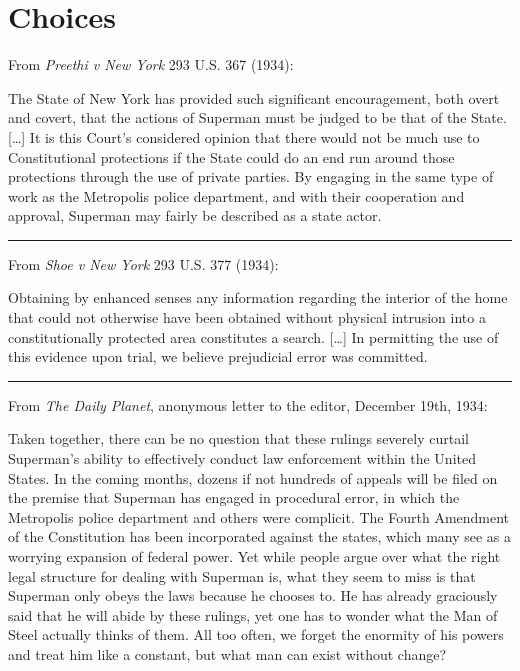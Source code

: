 \chapter{Choices}\label{choices}

From \emph{Preethi v New York} 293 U.S. 367 (1934):

The State of New York has provided such significant encouragement, both
overt and covert, that the actions of Superman must be judged to be that
of the State. {[}\ldots{}{]} It is this Court's considered opinion that
there would not be much use to Constitutional protections if the State
could do an end run around those protections through the use of private
parties. By engaging in the same type of work as the Metropolis police
department, and with their cooperation and approval, Superman may fairly
be described as a state actor.

\begin{center}\rule{0.5\linewidth}{\linethickness}\end{center}

From \emph{Shoe v New York} 293 U.S. 377 (1934):

Obtaining by enhanced senses any information regarding the interior of
the home that could not otherwise have been obtained without physical
intrusion into a constitutionally protected area constitutes a search.
{[}\ldots{}{]} In permitting the use of this evidence upon trial, we
believe prejudicial error was committed.

\begin{center}\rule{0.5\linewidth}{\linethickness}\end{center}

From \emph{The Daily Planet}, anonymous letter to the editor, December
19th, 1934:

Taken together, there can be no question that these rulings severely
curtail Superman's ability to effectively conduct law enforcement within
the United States. In the coming months, dozens if not hundreds of
appeals will be filed on the premise that Superman has engaged in
procedural error, in which the Metropolis police department and others
were complicit. The Fourth Amendment of the Constitution has been
incorporated against the states, which many see as a worrying expansion
of federal power. Yet while people argue over what the right legal
structure for dealing with Superman is, what they seem to miss is that
Superman only obeys the laws because he chooses to. He has already
graciously said that he will abide by these rulings, yet one has to
wonder what the Man of Steel actually thinks of them. All too often, we
forget the enormity of his powers and treat him like a constant, but
what man can exist without change?

